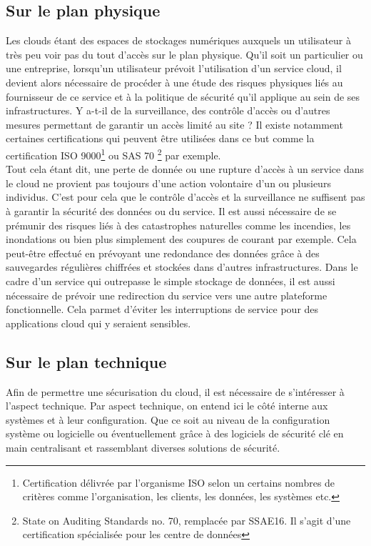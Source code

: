 \documentclass[a4paper, 12pt]{article}
\begin{document}
    \subsection{Sur le plan physique}
      Les clouds étant des espaces de stockages numériques auxquels un 
      utilisateur à très peu voir pas du tout d'accès sur le plan physique. 
      Qu'il soit un particulier ou une entreprise, lorsqu'un utilisateur 
      prévoit l'utilisation d'un service cloud, il devient alors nécessaire de
      procéder à une étude des risques physiques liés au fournisseur de 
      ce service et à la politique de sécurité qu'il applique au sein de ses 
      infrastructures. Y a-t-il de la surveillance, des contrôle d'accès ou 
      d'autres mesures permettant de garantir un accès limité au site ? Il
      existe notamment certaines certifications qui peuvent être utilisées dans
      ce but comme la certification ISO 9000\footnote{Certification délivrée 
      par l'organisme ISO selon un certains nombres de critères comme 
      l'organisation, les clients, les données, les systèmes etc.} ou SAS 70
      \footnote{State on Auditing Standards no. 70, remplacée par SSAE16. Il 
      s'agit d'une certification spécialisée pour les centre de données} par 
      exemple. \\

      Tout cela étant dit, une perte de donnée ou une rupture d'accès à un 
      service dans le cloud ne provient pas toujours d'une action volontaire 
      d'un ou plusieurs individus. C'est pour cela que le contrôle d'accès et 
      la surveillance ne suffisent pas à garantir la sécurité des données ou
      du service. Il est aussi nécessaire de se prémunir des risques liés à des
      catastrophes naturelles comme les incendies, les inondations ou bien 
      plus simplement des coupures de courant par exemple. Cela peut-être 
      effectué en prévoyant une redondance des données grâce à des sauvegardes 
      régulières chiffrées et stockées dans d'autres infrastructures. Dans le 
      cadre d'un service qui outrepasse le simple stockage de données, il est 
      aussi nécessaire de prévoir une redirection du service vers une autre 
      plateforme fonctionnelle. Cela parmet d'éviter les interruptions de 
      service pour des applications cloud qui y seraient sensibles.

    \subsection{Sur le plan technique}
      Afin de permettre une sécurisation du cloud, il est nécessaire de 
      s'intéresser à l'aspect technique. Par aspect technique, on entend ici
      le côté interne aux systèmes et à leur configuration. Que ce soit au 
      niveau de la configuration système ou logicielle ou éventuellement grâce 
      à des logiciels de sécurité clé en main centralisant et rassemblant 
      diverses solutions de sécurité. \\
\end{document}
